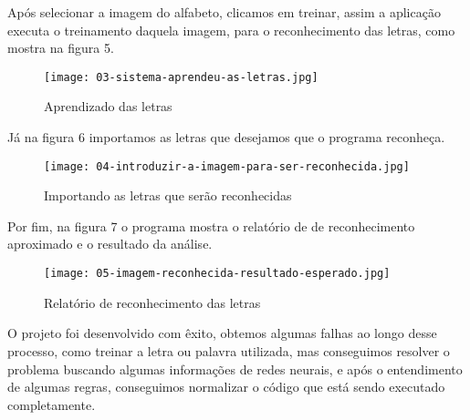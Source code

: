 	Após selecionar a imagem do alfabeto, clicamos em treinar, assim a aplicação executa o treinamento daquela imagem, para o reconhecimento das letras, como mostra na figura 5.
	
	\begin{figure}[!htb]
		\centering
		\texttt{[image: 03-sistema-aprendeu-as-letras.jpg]}
		\caption{Aprendizado das letras}
	\end{figure}
	
	Já na figura 6 importamos as letras que desejamos que o programa reconheça.
	
	\begin{figure}[!htb]
		\centering
		\texttt{[image: 04-introduzir-a-imagem-para-ser-reconhecida.jpg]}
		\caption{Importando as letras que serão reconhecidas}
	\end{figure}
	
	Por fim, na figura 7 o programa mostra o relatório de de reconhecimento aproximado e o resultado da análise.
	
	\begin{figure}[!htb]
		\centering
		\texttt{[image: 05-imagem-reconhecida-resultado-esperado.jpg]}
		\caption{Relatório de reconhecimento das letras}
	\end{figure}

	O projeto foi desenvolvido com êxito, obtemos algumas falhas ao longo desse processo, como treinar a letra ou palavra utilizada, mas conseguimos resolver o problema buscando algumas informações de redes neurais, e após o entendimento de algumas regras, conseguimos normalizar o código que está sendo executado completamente.